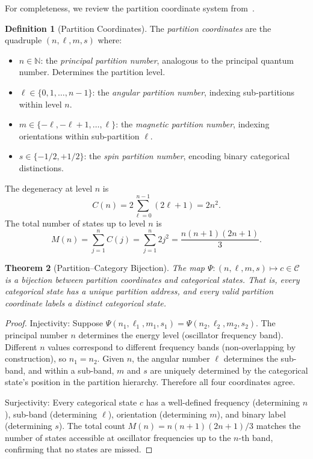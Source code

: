\documentclass[twocolumn,10pt]{article}
\newtheorem{theorem}{Theorem}[section]
\theoremstyle{definition}
\newtheorem{definition}[theorem]{Definition}
\theoremstyle{remark}
\newcommand{\N}{\mathbb{N}}
\begin{document}
For completeness, we review the partition coordinate system
from~\cite{sachikonye2026partition}.

\begin{definition}[Partition Coordinates]\label{def:partition-coords}
The \emph{partition coordinates} are the quadruple $(n, \ell, m, s)$ where:
\begin{itemize}
  \item $n \in \N$: the \emph{principal partition number}, analogous to the
    principal quantum number. Determines the partition level.
  \item $\ell \in \{0, 1, \ldots, n-1\}$: the \emph{angular partition
    number}, indexing sub-partitions within level $n$.
  \item $m \in \{-\ell, -\ell+1, \ldots, \ell\}$: the \emph{magnetic
    partition number}, indexing orientations within sub-partition $\ell$.
  \item $s \in \{-1/2, +1/2\}$: the \emph{spin partition number}, encoding
    binary categorical distinctions.
\end{itemize}
The degeneracy at level $n$ is
\begin{equation}\label{eq:degeneracy}
  C(n) = 2 \sum_{\ell=0}^{n-1} (2\ell + 1) = 2n^2.
\end{equation}
The total number of states up to level $n$ is
\begin{equation}\label{eq:total-states}
  M(n) = \sum_{j=1}^{n} C(j) = \sum_{j=1}^{n} 2j^2
  = \frac{n(n+1)(2n+1)}{3}.
\end{equation}
\end{definition}

\begin{theorem}[Partition--Category Bijection]\label{thm:partition-bijection}
The map $\Psi: (n, \ell, m, s) \mapsto c \in \mathcal{C}$ is a bijection
between partition coordinates and categorical states. That is, every
categorical state has a unique partition address, and every valid partition
coordinate labels a distinct categorical state.
\end{theorem}

\begin{proof}
Injectivity: Suppose $\Psi(n_1, \ell_1, m_1, s_1) = \Psi(n_2, \ell_2,
m_2, s_2)$. The principal number $n$ determines the energy level
(oscillator frequency band). Different $n$ values correspond to different
frequency bands (non-overlapping by construction), so $n_1 = n_2$. Given
$n$, the angular number $\ell$ determines the sub-band, and within a
sub-band, $m$ and $s$ are uniquely determined by the categorical state's
position in the partition hierarchy. Therefore all four coordinates agree.

Surjectivity: Every categorical state $c$ has a well-defined frequency
(determining $n$), sub-band (determining $\ell$), orientation (determining
$m$), and binary label (determining $s$). The total count
$M(n) = n(n+1)(2n+1)/3$ matches the number of states accessible at
oscillator frequencies up to the $n$-th band, confirming that no states
are missed.
\end{proof}
\end{document}

